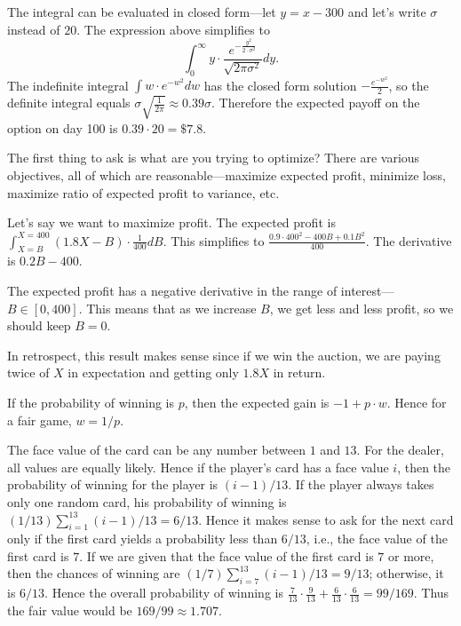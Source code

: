 
The integral can be evaluated in closed form---let $y = x -300$ and
let's write $\sigma$ instead of $20$.
The expression above simplifies to
\[
\int_{0}^{\infty} y \cdot \frac{e^{-\frac{y^2}{2\cdot \sigma^2}}}{\sqrt{2 \pi \sigma^2}} dy .
\]
The indefinite integral $\int w\cdot e^{-w^2} dw$ has the closed form solution $-\frac{e^{-w^2}}{2}$, so the 
definite integral equals $\sigma \sqrt{\frac{1}{2 \pi}} \approx 0.39 \sigma$.
Therefore the expected payoff on the option on day 100 is $0.39 \cdot 20 =
\$7.8$.

The first thing to ask is what are you trying to optimize? There
are various objectives, all of which are reasonable---maximize expected
profit, minimize loss, maximize ratio of expected profit to variance, etc.

Let's say we want to maximize profit. The expected profit is
$\int_{X = B }^{X=400} ( 1.8 X - B)\cdot \frac{1}{400} dB$.
This simplifies to $\frac{0.9 \cdot 400^2 - 400 B + 0.1 B^2}{400}$.
The derivative is $0.2B - 400$. 

The expected profit has a negative derivative in the range of interest---$B \in [0,400]$.
This means that as we increase $B$, we get less and less profit, so we should keep $B=0$.

In retrospect, this result makes sense since if we win the auction, we are
paying twice of $X$ in expectation and getting only $1.8X$ in return.


If the probability of winning is $p$, then the expected gain is $-1
+ p\cdot w$. Hence for a fair game, $w = 1/p$. 

The face value of the card can be any number between $1$ and $13$. For the dealer, all values are equally likely. Hence if the
player's card has a face value $i$, then the probability of winning for
the player is $(i-1)/13$. If the player always takes only one random card,
his probability of winning is $(1/13)\sum_{i=1}^{13}{(i-1)/13} =
6/13$. Hence it makes sense to ask for the next card only if the first
card yields a probability less than $6/13$, i.e., the face value of the first
card is $7$. If we are given that the face value of the first card is $7$ or 
more, then the chances of winning are $(1/7)\sum_{i=7}^{13}{(i-1)/13} = 9/13$; otherwise, it is $6/13$. Hence the 
overall probability of winning is  
$\frac{7}{13}\cdot\frac{9}{13} + \frac{6}{13}\cdot\frac{6}{13} = 99/169$.
Thus the fair value would be $169/99 \approx 1.707$.

